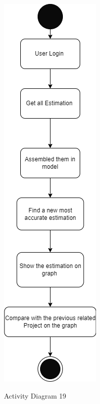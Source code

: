 \begin{figure}[H]
    \centering
    \caption{Activity Diagram 19}
    \includegraphics[scale=0.5]{./diagrams/Activity Diagram/ad-19.png}
    \label{fig:act-19}

\end{figure}


